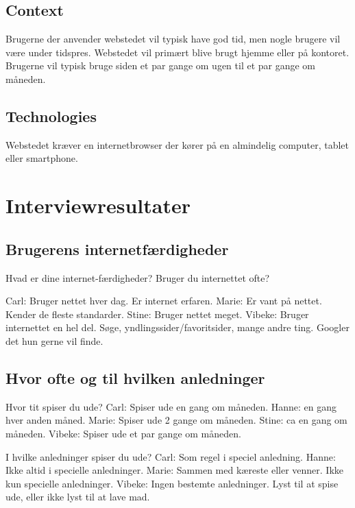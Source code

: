 \documentclass[a4paper, 12pt]{article}
\begin{document}
\subsection{Context}

Brugerne der anvender webstedet vil typisk have god tid, men nogle brugere vil
være under tidspres. Webstedet vil primært blive brugt hjemme eller på kontoret.
Brugerne vil typisk bruge siden et par gange om ugen til et par gange om
måneden.

\subsection{Technologies}

Webstedet kræver en internetbrowser der kører på en almindelig computer, tablet
eller smartphone.

\section{Interviewresultater}
\label{sec:Interviewresultater}
\subsection{Brugerens internetfærdigheder}

  Hvad er dine internet-færdigheder? Bruger du internettet ofte?

    Carl: Bruger nettet hver dag. Er internet erfaren.
    Marie: Er vant på nettet. Kender de fleste standarder.  
    Stine: Bruger nettet meget.
    Vibeke: Bruger internettet en hel del. Søge, yndlingssider/favoritsider, mange andre
	    ting. Googler det hun gerne vil finde.


\subsection{Hvor ofte og til hvilken anledninger}

  Hvor tit spiser du ude?
    Carl: Spiser ude en gang om måneden.
    Hanne: en gang hver anden måned.
    Marie: Spiser ude 2 gange om måneden.
    Stine: ca en gang om måneden.
    Vibeke: Spiser ude et par gange om måneden.
    

  I hvilke anledninger spiser du ude?
    Carl: Som regel i speciel anledning.
    Hanne: Ikke altid i specielle anledninger.
    Marie: Sammen med kæreste eller venner. Ikke kun specielle anledninger.
    Vibeke: Ingen bestemte anledninger. Lyst til at spise ude, eller ikke lyst til at lave mad.
\end{document}
